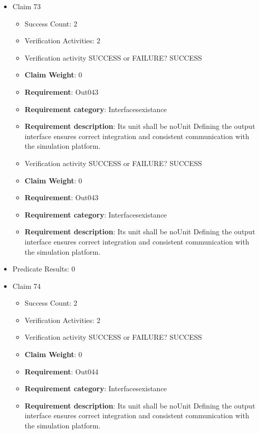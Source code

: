 \documentclass{article}
\begin{document}
\begin{itemize}
  				  \item Claim 73
				\begin{itemize}
			    	\item Success Count: 2 
			    	\item Verification Activities: 2
					\item Verification activity SUCCESS or FAILURE? SUCCESS
					\item \textbf{Claim Weight}: 0
						\item \textbf{Requirement}: Out043 
						\item \textbf{Requirement category}: Interfacesexistance 
						\item \textbf{Requirement description}: Its unit shall be noUnit Defining the output interface ensures correct integration and consistent communication with the simulation platform.
					
					\item Verification activity SUCCESS or FAILURE? SUCCESS
					\item \textbf{Claim Weight}: 0
						\item \textbf{Requirement}: Out043 
						\item \textbf{Requirement category}: Interfacesexistance 
						\item \textbf{Requirement description}: Its unit shall be noUnit Defining the output interface ensures correct integration and consistent communication with the simulation platform.
					
				\end{itemize}
				
									    
				\item Predicate Results: 0

  				  \item Claim 74
				\begin{itemize}
			    	\item Success Count: 2 
			    	\item Verification Activities: 2
					\item Verification activity SUCCESS or FAILURE? SUCCESS
					\item \textbf{Claim Weight}: 0
						\item \textbf{Requirement}: Out044 
						\item \textbf{Requirement category}: Interfacesexistance 
						\item \textbf{Requirement description}: Its unit shall be noUnit Defining the output interface ensures correct integration and consistent communication with the simulation platform.
					

\end{itemize}
\end{itemize}
\end{document}
